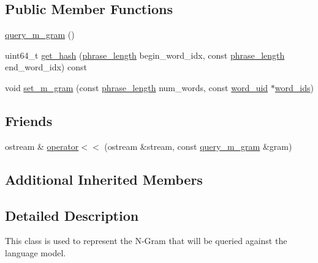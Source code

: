 \subsection*{Public Member Functions}
\begin{DoxyCompactItemize}
\item 
\hyperlink{classuva_1_1smt_1_1bpbd_1_1server_1_1lm_1_1m__grams_1_1query__m__gram_a868233480801bab19653b71d6e2a7ae5}{query\+\_\+m\+\_\+gram} ()
\item 
uint64\+\_\+t \hyperlink{classuva_1_1smt_1_1bpbd_1_1server_1_1lm_1_1m__grams_1_1query__m__gram_a3454f3d5182583c46a12571e45488d1f}{get\+\_\+hash} (\hyperlink{namespaceuva_1_1smt_1_1bpbd_1_1server_af068a19c2e03116caf3e3827a3e40e35}{phrase\+\_\+length} begin\+\_\+word\+\_\+idx, const \hyperlink{namespaceuva_1_1smt_1_1bpbd_1_1server_af068a19c2e03116caf3e3827a3e40e35}{phrase\+\_\+length} end\+\_\+word\+\_\+idx) const 
\item 
void \hyperlink{classuva_1_1smt_1_1bpbd_1_1server_1_1lm_1_1m__grams_1_1query__m__gram_abb63b8913997205d9aa18bc874850568}{set\+\_\+m\+\_\+gram} (const \hyperlink{namespaceuva_1_1smt_1_1bpbd_1_1server_af068a19c2e03116caf3e3827a3e40e35}{phrase\+\_\+length} num\+\_\+words, const \hyperlink{namespaceuva_1_1smt_1_1bpbd_1_1server_a6bfe45ba344d65a7fdd7d26156328ddc}{word\+\_\+uid} $\ast$\hyperlink{classuva_1_1smt_1_1bpbd_1_1server_1_1lm_1_1m__grams_1_1phrase__base_a5dc6f9171cf46eb946e30595a24f7d0e}{word\+\_\+ids})
\end{DoxyCompactItemize}
\subsection*{Friends}
\begin{DoxyCompactItemize}
\item 
ostream \& \hyperlink{classuva_1_1smt_1_1bpbd_1_1server_1_1lm_1_1m__grams_1_1query__m__gram_a68d5aef7299922cdc0b8609d55066e51}{operator$<$$<$} (ostream \&stream, const \hyperlink{classuva_1_1smt_1_1bpbd_1_1server_1_1lm_1_1m__grams_1_1query__m__gram}{query\+\_\+m\+\_\+gram} \&gram)
\end{DoxyCompactItemize}
\subsection*{Additional Inherited Members}


\subsection{Detailed Description}
This class is used to represent the N-\/\+Gram that will be queried against the language model. 

